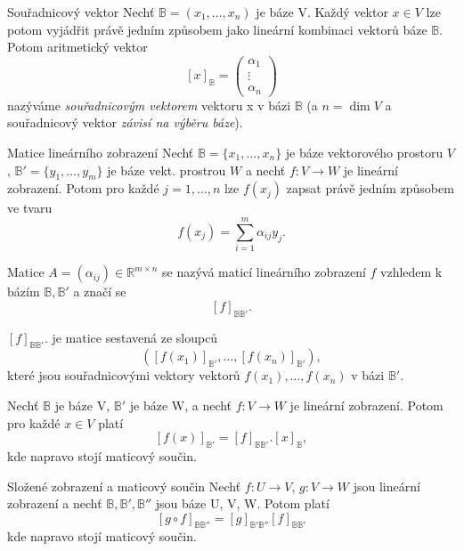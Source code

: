 \begin{definiceN}{Souřadnicový vektor}
Nechť $\mathbb{B}=(x_1,\dots,x_n)$ je báze V. Každý vektor $x \in V$ lze potom vyjádřit právě jedním způsobem jako lineární kombinaci vektorů báze $\mathbb{B}$. Potom aritmetický vektor
$$[x]_{\mathbb{B}} = \left( \begin{array}{l}\alpha_1 \\ \vdots \\ \alpha_n \end{array} \right)$$
nazýváme \emph{souřadnicovým vektorem} vektoru x v bázi $\mathbb{B}$ (a $n=\dim V$ a souřadnicový vektor \emph{závisí na výběru báze}).
\end{definiceN}


\begin{definiceN}{Matice lineárního zobrazení}
Nechť $\mathbb{B}=\{x_1, \dots, x_n\}$ je báze vektorového prostoru $V$, $\mathbb{B}'=\{y_1, \dots, y_m\}$ je báze vekt. prostrou $W$ a nechť $f: V \rightarrow W$ je lineární zobrazení. Potom pro každé $j=1, \dots, n$ lze $f(x_j)$ zapsat právě jedním způsobem ve tvaru
$$f(x_j) = \sum_{i = 1}^{m} \alpha_{ij} y_j.$$

Matice $A=(\alpha_{ij}) \in \mathbb{R}^{m \times n}$ se nazývá maticí lineárního zobrazení $f$ vzhledem k bázím $\mathbb{B}, \mathbb{B}'$ a značí se
$$[f]_{\mathbb{B}\mathbb{B}'}.$$
\end{definiceN}

\begin{pozorovani}
$[f]_{\mathbb{B}\mathbb{B}'}.$ je matice sestavená ze sloupců
$$([f(x_1)]_{\mathbb{B}'}, \dots, [f(x_n)]_{\mathbb{B}'}),$$
které jsou souřadnicovými vektory vektorů $f(x_1), \dots, f(x_n)$ v bázi $\mathbb{B}'$.
\end{pozorovani}

\begin{veta}
Nechť $\mathbb{B}$ je báze V, $\mathbb{B}'$ je báze W, a nechť $f: V \rightarrow W$ je lineární zobrazení. Potom pro každé $x \in V$ platí
$$[f(x)]_{\mathbb{B}'} = [f]_{\mathbb{B} \mathbb{B}'}.[x]_{\mathbb{B}},$$
kde napravo stojí maticový součin.
\end{veta}

\begin{vetaN}{Složené zobrazení a maticový součin}
Nechť $f: U \rightarrow V$, $g: V \rightarrow W$ jsou lineární zobrazení a nechť $\mathbb{B}, \mathbb{B}', \mathbb{B}''$ jsou báze U, V, W. Potom platí
$$[g \circ f]_{\mathbb{B} \mathbb{B}''}=[g]_{\mathbb{B}'\mathbb{B}''} [f]_{\mathbb{B}\mathbb{B}'}$$
kde napravo stojí maticový součin.
\end{vetaN}

